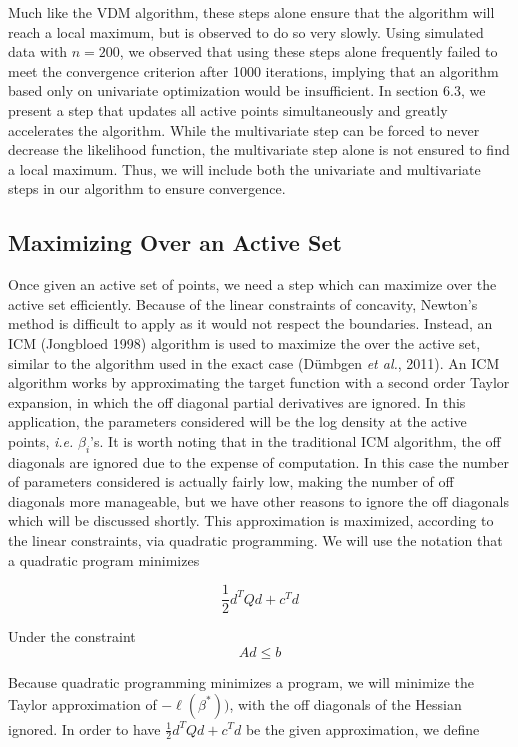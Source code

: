 	Much like the VDM algorithm, these steps alone ensure that the algorithm will reach a local maximum, but is observed to do so very slowly. Using simulated data with $n = 200$, we observed that using these steps alone frequently failed to meet the convergence criterion after 1000 iterations, implying that an algorithm based only on univariate optimization would be insufficient. In section 6.3, we present a step that updates all active points simultaneously and greatly accelerates the algorithm. While the multivariate step can be forced to never decrease the likelihood function, the multivariate step alone is not ensured to find a local maximum. Thus, we will include both the univariate and multivariate steps in our algorithm to ensure convergence. 
	
	{\subsection{Maximizing Over an Active Set} }
	
	Once given an active set of points, we need a step which can  maximize over the active set efficiently. Because of the linear constraints of concavity, Newton's method is difficult to apply as it would not respect the boundaries. Instead, an ICM (Jongbloed 1998) algorithm is used to maximize the over the active set, similar to the algorithm used in the exact case (D\"umbgen \emph{et al.}, 2011). An ICM algorithm works by approximating the target function with a second order Taylor expansion, in which the off diagonal partial derivatives are ignored. In this application, the parameters considered will be the log density at the active points, \emph{i.e.} $\beta_i$'s. It is worth noting that in the traditional ICM algorithm, the off diagonals are ignored due to the expense of computation. In this case the number of parameters considered  is actually fairly low, making the number of off diagonals more manageable, but we have other reasons to ignore the off diagonals which will be discussed shortly. This approximation is maximized, according to the linear constraints, via quadratic programming. We will use the notation that a quadratic program minimizes
	
	\[ \frac{1}{2} d^T Q d + c^T d
	\]
	
	Under the constraint \[ A d \leq b\]
	
	Because quadratic programming minimizes a program, we will minimize the Taylor approximation of $-\ell(\beta^*))$, with the off diagonals of the Hessian ignored. In order to have $\frac{1}{2} d^T Q d + c^T d$ be the given approximation, we define
	
